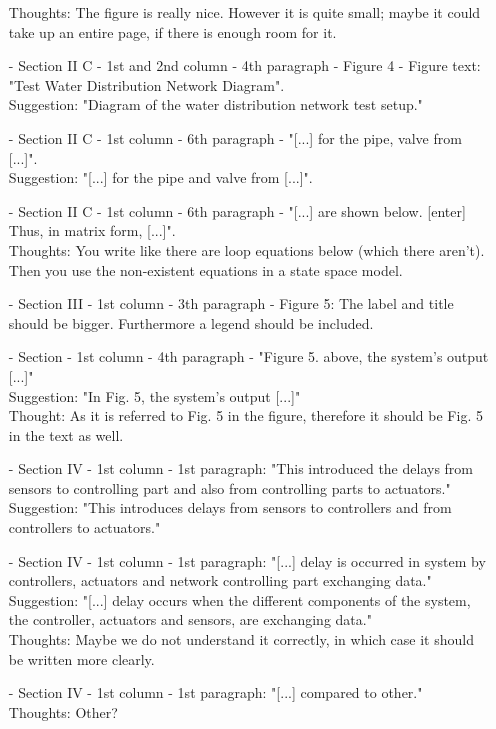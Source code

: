 \begin{itemize}
Thoughts: The figure is really nice. However it is quite small; maybe it could take up an entire page, if there is enough room for it.\\
\item[-]Section II C - 1st and 2nd column - 4th paragraph - Figure 4 - Figure text: "Test Water Distribution Network Diagram".\\
Suggestion: "Diagram of the water distribution network test setup."\\
\item[-]Section II C - 1st column - 6th paragraph - "[...] for the pipe, valve from [...]".\\
Suggestion: "[...] for the pipe and valve from [...]".\\
\item[-]Section II C - 1st column - 6th paragraph - "[...] are shown below. [enter] Thus, in matrix form, [...]".\\
Thoughts: You write like there are loop equations below (which there aren't). Then you use the non-existent equations in a state space model.\\
\item[-]Section III - 1st column - 3th paragraph - Figure 5: The label and title should be bigger. Furthermore a legend should be included.\\
\item[-]Section - 1st column - 4th paragraph - "Figure 5. above, the system's output [...]"\\
Suggestion: "In Fig. 5, the system's output [...]"\\
Thought: As it is referred to Fig. 5 in the figure, therefore it should be Fig. 5 in the text as well.\\
\item[-]Section IV - 1st column - 1st paragraph: "This introduced the delays from sensors to controlling part and also from controlling parts to actuators."\\
Suggestion: "This introduces delays from sensors to controllers and from controllers to actuators."\\
\item[-]Section IV - 1st column - 1st paragraph: "[...] delay is occurred in system by controllers, actuators and network controlling part exchanging data."\\
Suggestion: "[...] delay occurs when the different components of the system, the controller, actuators and sensors, are exchanging data."\\
Thoughts: Maybe we do not understand it correctly, in which case it should be written more clearly.\\
\item[-]Section IV - 1st column - 1st paragraph: "[...] compared to other."\\
Thoughts: Other?
\end{itemize}
